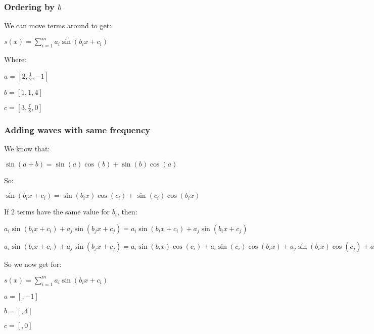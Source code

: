 \subsubsection{Ordering by \(b\)}

We can move terms around to get:

$s(x)=\sum^m_{i=1}a_i\sin(b_ix+c_i)$

Where:

$a=[2,\frac{1}{2},-1]$

$b=[1,1,4]$

$c=[3,\frac{\tau}{8},0]$

\subsubsection{Adding waves with same frequency}

We know that:

$\sin(a+b)=\sin(a)\cos(b)+\sin(b)\cos(a)$

So:

$\sin(b_ix+c_i)=\sin(b_ix)\cos(c_i)+\sin(c_i)\cos(b_ix)$

If \(2\) terms have the same value for \(b_i\), then:

$a_i\sin(b_ix+c_i)+a_j\sin(b_jx+c_j)=a_i\sin(b_ix+c_i)+a_j\sin(b_ix+c_j)$

$a_i\sin(b_ix+c_i)+a_j\sin(b_jx+c_j)=a_i\sin(b_ix)\cos(c_i)+a_i\sin(c_i)\cos(b_ix)+a_j\sin(b_ix)\cos(c_j)+a_j\sin(c_j)\cos(b_ix)$

So we now get for:

$s(x)=\sum^m_{i=1}a_i\sin(b_ix+c_i)$

$a=[,-1]$

$b=[,4]$

$c=[,0]$

